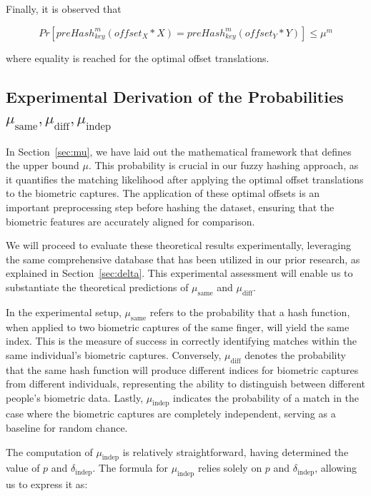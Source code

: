 Finally, it is observed that

\begin{equation}
    Pr[preHash_{key}^m(offset_X * X) = preHash_{key}^m(offset_Y * Y)] \leq \mu^m
\end{equation}

where equality is reached for the optimal offset translations.

\subsection{Experimental Derivation of the Probabilities \(\mu_{\text{same}}, \mu_{\text{diff}}, \mu_{\text{indep}}\)}

In Section~\ref{sec:mu}, we have laid out the mathematical framework that defines the upper bound \(\mu\). This probability is crucial in our fuzzy hashing approach, as it quantifies the matching likelihood after applying the optimal offset translations to the biometric captures. The application of these optimal offsets is an important preprocessing step before hashing the dataset, ensuring that the biometric features are accurately aligned for comparison.

We will proceed to evaluate these theoretical results experimentally, leveraging the same comprehensive database that has been utilized in our prior research, as explained in Section~\ref{sec:delta}. This experimental assessment will enable us to substantiate the theoretical predictions of \(\mu_{\text{same}}\) and \(\mu_{\text{diff}}\).

In the experimental setup, \(\mu_{\text{same}}\) refers to the probability that a hash function, when applied to two biometric captures of the same finger, will yield the same index. This is the measure of success in correctly identifying matches within the same individual's biometric captures. Conversely, \(\mu_{\text{diff}}\) denotes the probability that the same hash function will produce different indices for biometric captures from different individuals, representing the ability to distinguish between different people's biometric data. Lastly, \(\mu_{\text{indep}}\) indicates the probability of a match in the case where the biometric captures are completely independent, serving as a baseline for random chance.

The computation of \( \mu_{\text{indep}} \) is relatively straightforward, having determined the value of \( p \) and \(\delta_{\text{indep}}\). The formula for \( \mu_{\text{indep}} \) relies solely on \( p \) and \(\delta_{\text{indep}}\), allowing us to express it as:

